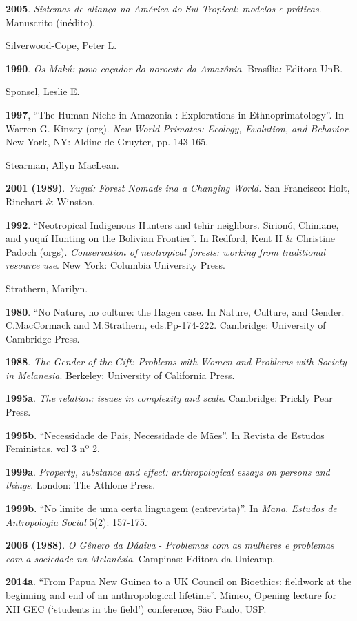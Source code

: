 \textbf{2005}. \emph{Sistemas de aliança na América do Sul Tropical:
modelos e práticas}. Manuscrito (inédito).

Silverwood-Cope, Peter L.

\textbf{1990}. \emph{Os Makú: povo caçador do noroeste da Amazônia}.
Brasília: Editora UnB.

Sponsel, Leslie E.

\textbf{1997}, ``The Human Niche in Amazonia : Explorations in
Ethnoprimatology''. In Warren G. Kinzey (org). \emph{New World Primates:
Ecology, Evolution, and Behavior}. New York, NY: Aldine de Gruyter, pp.
143-165.

Stearman, Allyn MacLean.

\textbf{2001 (1989)}. \emph{Yuquí: Forest Nomads ina a Changing World.}
San Francisco: Holt, Rinehart \& Winston.

\textbf{1992}. ``Neotropical Indigenous Hunters and tehir neighbors.
Sirionó, Chimane, and yuquí Hunting on the Bolivian Frontier''. In
Redford, Kent H \& Christine Padoch (orgs). \emph{Conservation of
neotropical forests: working from traditional resource use}. New York:
Columbia University Press.

Strathern, Marilyn.

\textbf{1980}. ``No Nature, no culture: the Hagen case. In Nature,
Culture, and Gender. C.MacCormack and M.Strathern, eds.Pp-174-222.
Cambridge: University of Cambridge Press.

\textbf{1988}. \emph{The Gender of the Gift: Problems with Women and
Problems with Society in Melanesia}. Berkeley: University of California
Press.

\textbf{1995a}. \emph{The relation: issues in complexity and scale}.
Cambridge: Prickly Pear Press.

\textbf{1995b}. ``Necessidade de Pais, Necessidade de Mães''. In Revista
de Estudos Feministas, vol 3 nº 2.

\textbf{1999a}. \emph{Property, substance and effect: anthropological
essays on persons and things}. London: The Athlone Press.

\textbf{1999b}. ``No limite de uma certa linguagem (entrevista)''. In
\emph{Mana}. \emph{Estudos de Antropologia Social} 5(2): 157-175.

\textbf{2006 (1988)}. \emph{O Gênero da Dádiva} - \emph{Problemas com as
mulheres e problemas com a sociedade na Melanésia}. Campinas: Editora da
Unicamp.

\textbf{2014a}. ``From Papua New Guinea to a UK Council on Bioethics:
fieldwork at the beginning and end of an anthropological lifetime''.
Mimeo, Opening lecture for XII GEC (`students in the field') conference,
São Paulo, USP.

